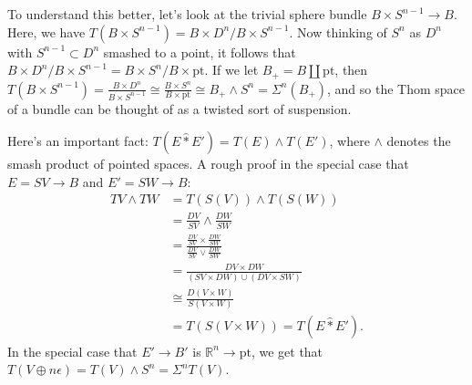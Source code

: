 \documentclass{article}
\newcommand{\R}{\mathbb{R}}
\newcommand{\sprod}{\wedge}
\newcommand{\wsum}{\vee}
\newcommand{\pt}[1]{#1_+}
\newcommand{\ptspace}{\mathrm{pt}}
\newcommand{\Suspend}{\Sigma}
\begin{document}
To understand this better, let's look at the trivial sphere bundle $B \times S^{n-1} \to B$.  Here, we have $T(B \times S^{n-1}) = B \times D^n / B \times S^{n-1}$.  Now thinking of $S^n$ as $D^n$ with $S^{n-1} \subset D^n$ smashed to a point, it follows that $B \times D^n / B \times S^{n-1} = B \times S^n / B \times \ptspace$.  If we let $\pt{B} = B \amalg \ptspace$, then $T(B \times S^{n-1}) = \frac{B \times D^n}{B \times S^{n-1}} \cong \frac{B \times S^n}{B \times \ptspace} \cong \pt{B} \sprod S^n = \Suspend^n(\pt{B})$, and so the Thom space of a bundle can be thought of as a twisted sort of suspension.

Here's an important fact: $T(E \hat \ast E') = T(E) \sprod T(E')$, where $\sprod$ denotes the smash product of pointed spaces.  A rough proof in the special case that $E = SV \to B$ and $E' = SW \to B$:
\begin{align*}
TV \sprod TW & = T(S(V)) \sprod T(S(W)) \\
& = \frac{DV}{SV} \sprod \frac{DW}{SW} \\
& = \frac{\frac{DV}{SV} \times \frac{DW}{SW}}{\frac{DV}{SV} \wsum \frac{DW}{SW}} \\
& = \frac{DV \times DW}{(SV \times DW) \cup (DV \times SW)} \\
& \cong \frac{D(V \times W)}{S(V \times W)} \\
& = T(S(V \times W)) = T(E \hat \ast E').
\end{align*}
In the special case that $E' \to B'$ is $\R^n \to \ptspace$, we get that $T(V \oplus n \epsilon) = T(V) \sprod S^n = \Suspend^n T(V)$.
\end{document}
